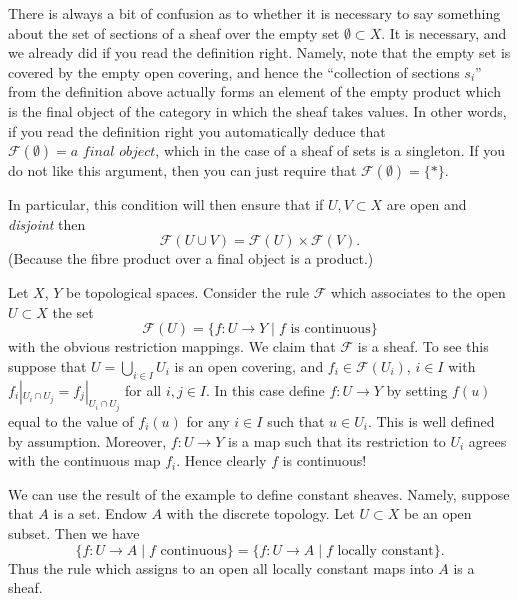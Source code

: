 \begin{remark}
\label{remark-confusion}
There is always a bit of confusion as to whether it is
necessary to say something about the set of sections of
a sheaf over the empty set $\emptyset \subset X$.
It is necessary, and we already did if you read the
definition right. Namely, note that the empty set is
covered by the empty open covering, and hence the ``collection
of sections $s_i$'' from the definition above actually forms
an element of the empty product which is the final object
of the category in which the sheaf takes values. In other words,
if you read the definition right you automatically deduce
that $\mathcal{F}(\emptyset) = \textit{a final object}$,
which in the case of a sheaf of sets is a singleton.
If you do not like this argument, then you can just require
that $\mathcal{F}(\emptyset) = \{*\}$.

\medskip\noindent
In particular, this condition will then ensure that if
$U, V \subset X$ are open and {\it disjoint} then
$$
\mathcal{F}(U \cup V) = \mathcal{F}(U) \times \mathcal{F}(V).
$$
(Because the fibre product over a final object is a product.)
\end{remark}

\begin{example}
\label{example-basic-continuous-maps}
Let $X$, $Y$ be topological spaces.
Consider the rule $\mathcal{F}$ which associates to
the open $U \subset X$ the set
$$
\mathcal{F}(U) = \{ f : U \to Y \mid f \text{ is continuous}\}
$$
with the obvious restriction mappings. We claim that
$\mathcal{F}$ is a sheaf. To see this suppose that
$U = \bigcup_{i\in I} U_i$ is an open covering, and
$f_i \in \mathcal{F}(U_i)$, $i\in I$ with
$f_i |_{U_i \cap U_j} = f_j|_{U_i \cap U_j}$ for all $i, j \in I$.
In this case define $f : U \to Y$ by setting $f(u)$
equal to the value of $f_i(u)$ for any $i \in I$ such that
$u \in U_i$. This is well defined by assumption. Moreover,
$f : U \to Y$ is a map such that its restriction to $U_i$
agrees with the continuous map $f_i$. Hence clearly $f$ is
continuous!
\end{example}

\noindent
We can use the result of the example to define constant
sheaves. Namely, suppose that $A$ is a set. Endow $A$ with
the discrete topology. Let $U \subset X$ be an open subset.
Then we have
$$
\{ f : U \to A \mid f\text{ continuous}\}
=
\{ f : U \to A \mid f\text{ locally constant}\}.
$$
Thus the rule which assigns to an open all locally
constant maps into $A$ is a sheaf.

